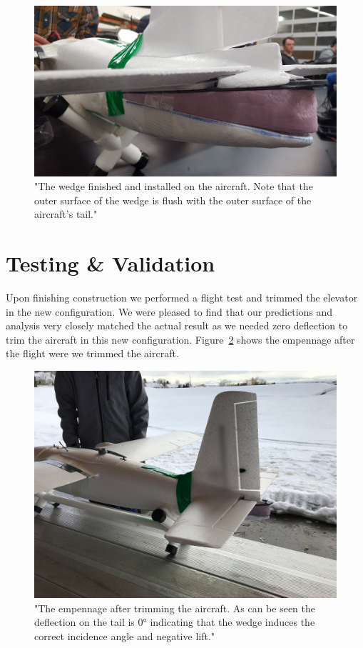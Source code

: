 \documentclass[]{auvsi_doc}
\begin{document}
\begin{figure}[h]
\includegraphics[width=\textwidth]{./figs/tailwedge.jpg}
\caption{"The wedge finished and installed on the aircraft. Note that the outer surface of the wedge is flush with the outer surface of the aircraft's tail."}
\label{wedge}
\end{figure}

\section{Testing \& Validation}

Upon finishing construction we performed a flight test and trimmed the elevator in the new configuration. We were pleased to find that our predictions and analysis very closely matched the actual result as we needed zero deflection to trim the aircraft in this new configuration. Figure~\ref{deflect} shows the empennage after the flight were we trimmed the aircraft.

\begin{figure}[h]
\includegraphics[width=\textwidth]{./figs/empennage.jpg}
\caption{"The empennage after trimming the aircraft. As can be seen the deflection on the tail is 0° indicating that the wedge induces the correct incidence angle and negative lift."}
\label{deflect}
\end{figure}
\end{document}

